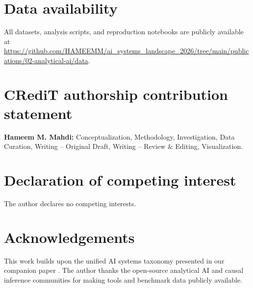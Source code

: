 \documentclass[preprint,12pt,authoryear]{elsarticle}
\theoremstyle{definition}
\begin{document}
\section*{Data availability}

All datasets, analysis scripts, and reproduction notebooks are publicly available at \url{https://github.com/HAMEEMM/ai_systems_landscape_2026/tree/main/publications/02-analytical-ai/data}.

\section*{CRediT authorship contribution statement}

\textbf{Hameem M. Mahdi:} Conceptualization, Methodology, Investigation, Data Curation, Writing -- Original Draft, Writing -- Review \& Editing, Visualization.

\section*{Declaration of competing interest}

The author declares no competing interests.

\section*{Acknowledgements}

This work builds upon the unified AI systems taxonomy presented in our companion paper \citep{mahdi2026taxonomy}. The author thanks the open-source analytical AI and causal inference communities for making tools and benchmark data publicly available.



\end{document}
